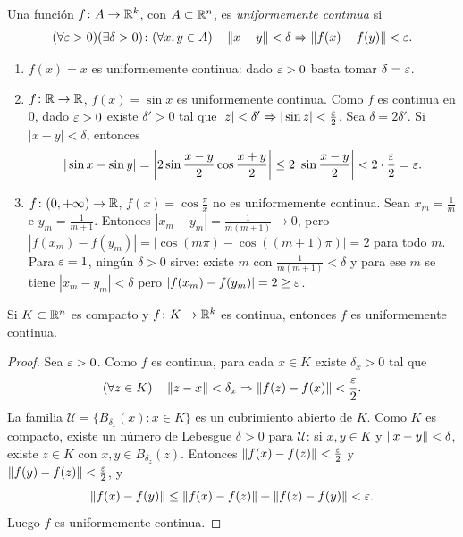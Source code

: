 \begin{definition}
  Una función \(f\colon A \to \mathbb{R}^k\), con \(A \subset \mathbb{R}^n\), es \emph{uniformemente continua} si
  \[
    (\forall \varepsilon > 0)(\exists \delta > 0) \colon (\forall x, y \in A) \quad \left\lVert x - y \right\rVert < \delta \Rightarrow \left\lVert f(x) - f(y) \right\rVert < \varepsilon.
  \]
\end{definition}

\begin{eg}
  \begin{enumerate}[label=(\arabic*)]
    \item \(f(x) = x\) es uniformemente continua: dado \(\varepsilon > 0\) basta tomar \(\delta = \varepsilon\).
    \item \(f\colon \mathbb{R} \to \mathbb{R}\), \(f(x) = \sin x\) es uniformemente continua. Como \(f\) es continua en \(0\), dado \(\varepsilon > 0\) existe \(\delta' > 0\) tal que \(|z| < \delta' \Rightarrow |\sin z| < \frac{\varepsilon}{2}\). Sea \(\delta = 2\delta'\). Si \(|x - y| < \delta\), entonces
          \[
            |\sin x - \sin y| = \left| 2 \sin \frac{x - y}{2} \cos \frac{x + y}{2} \right| \leq 2 \left| \sin \frac{x - y}{2} \right| < 2 \cdot \frac{\varepsilon}{2} = \varepsilon.
          \]
    \item \(f\colon (0, +\infty) \to \mathbb{R}\), \(f(x) = \cos \frac{\pi}{x}\) no es uniformemente continua. Sean \(x_m = \frac{1}{m}\) e \(y_m = \frac{1}{m + 1}\). Entonces \(|x_m - y_m| = \frac{1}{m(m+1)} \to 0\), pero \(|f(x_m) - f(y_m)| = \bigl| \cos(m\pi) - \cos((m+1)\pi) \bigr| = 2\) para todo \(m\). Para \(\varepsilon = 1\), ningún \(\delta > 0\) sirve: existe \(m\) con \(\frac{1}{m(m+1)} < \delta\) y para ese \(m\) se tiene \(|x_m - y_m| < \delta\) pero \(|f(x_m) - f(y_m)| = 2 \geq \varepsilon\).
  \end{enumerate}
\end{eg}

\begin{theorem}
  Si \(K \subset \mathbb{R}^n\) es compacto y \(f\colon K \to \mathbb{R}^k\) es continua, entonces \(f\) es uniformemente continua.
\end{theorem}

\begin{proof}
  Sea \(\varepsilon > 0\). Como \(f\) es continua, para cada \(x \in K\) existe \(\delta_x > 0\) tal que
  \[
    (\forall z \in K) \quad \left\lVert z - x \right\rVert < \delta_x \Rightarrow \left\lVert f(z) - f(x) \right\rVert < \frac{\varepsilon}{2}.
  \]
  La familia \(\mathscr{U} = \{ B_{\delta_x}(x) : x \in K \}\) es un cubrimiento abierto de \(K\). Como \(K\) es compacto, existe un número de Lebesgue \(\delta > 0\) para \(\mathscr{U}\): si \(x, y \in K\) y \(\left\lVert x - y \right\rVert < \delta\), existe \(z \in K\) con \(x, y \in B_{\delta_z}(z)\). Entonces \(\left\lVert f(x) - f(z) \right\rVert < \frac{\varepsilon}{2}\) y \(\left\lVert f(y) - f(z) \right\rVert < \frac{\varepsilon}{2}\), y
  \[
    \left\lVert f(x) - f(y) \right\rVert \leq \left\lVert f(x) - f(z) \right\rVert + \left\lVert f(z) - f(y) \right\rVert < \varepsilon.
  \]
  Luego \(f\) es uniformemente continua.
\end{proof}


